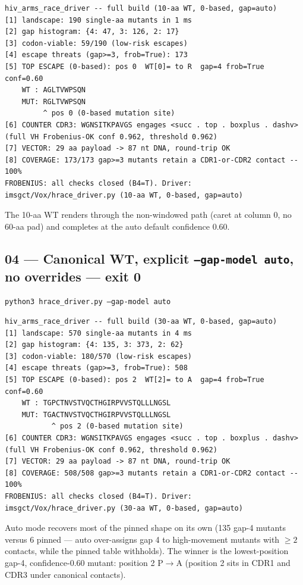 \documentclass{article}
\begin{document}
\begin{lstlisting}
hiv_arms_race_driver -- full build (10-aa WT, 0-based, gap=auto)
[1] landscape: 190 single-aa mutants in 1 ms
[2] gap histogram: {4: 47, 3: 126, 2: 17}
[3] codon-viable: 59/190 (low-risk escapes)
[4] escape threats (gap>=3, frob=True): 173
[5] TOP ESCAPE (0-based): pos 0  WT[0]= to R  gap=4 frob=True conf=0.60
    WT : AGLTVWPSQN
    MUT: RGLTVWPSQN
         ^ pos 0 (0-based mutation site)
[6] COUNTER CDR3: WGNSITKPAVGS engages <succ . top . boxplus . dashv> (full VH Frobenius-OK conf 0.962, threshold 0.962)
[7] VECTOR: 29 aa payload -> 87 nt DNA, round-trip OK
[8] COVERAGE: 173/173 gap>=3 mutants retain a CDR1-or-CDR2 contact -- 100%
FROBENIUS: all checks closed (B4=T). Driver: imsgct/Vox/hrace_driver.py (10-aa WT, 0-based, gap=auto)
\end{lstlisting}

The 10-aa WT renders through the non-windowed path (caret at column 0, no 60-aa
pad) and completes at the auto default confidence 0.60.

\subsection*{04 --- Canonical WT, explicit \texttt{--gap-model auto}, no overrides --- exit 0}
\texttt{python3 hrace\_driver.py --gap-model auto}

\begin{lstlisting}
hiv_arms_race_driver -- full build (30-aa WT, 0-based, gap=auto)
[1] landscape: 570 single-aa mutants in 4 ms
[2] gap histogram: {4: 135, 3: 373, 2: 62}
[3] codon-viable: 180/570 (low-risk escapes)
[4] escape threats (gap>=3, frob=True): 508
[5] TOP ESCAPE (0-based): pos 2  WT[2]= to A  gap=4 frob=True conf=0.60
    WT : TGPCTNVSTVQCTHGIRPVVSTQLLLNGSL
    MUT: TGACTNVSTVQCTHGIRPVVSTQLLLNGSL
           ^ pos 2 (0-based mutation site)
[6] COUNTER CDR3: WGNSITKPAVGS engages <succ . top . boxplus . dashv> (full VH Frobenius-OK conf 0.962, threshold 0.962)
[7] VECTOR: 29 aa payload -> 87 nt DNA, round-trip OK
[8] COVERAGE: 508/508 gap>=3 mutants retain a CDR1-or-CDR2 contact -- 100%
FROBENIUS: all checks closed (B4=T). Driver: imsgct/Vox/hrace_driver.py (30-aa WT, 0-based, gap=auto)
\end{lstlisting}

Auto mode recovers most of the pinned shape on its own (135 gap-4 mutants versus
6 pinned --- auto over-assigns gap 4 to high-movement mutants with \(\geq 2\)
contacts, while the pinned table withholds). The winner is the lowest-position
gap-4, confidence-0.60 mutant: position 2 P\(\to\)A (position 2 sits in CDR1 and
CDR3 under canonical contacts).
\end{document}
